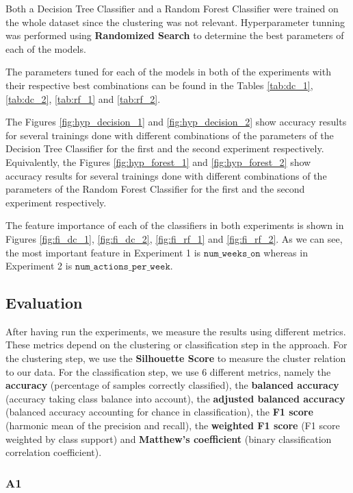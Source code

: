 \documentclass[sigplan,screen]{acmart}
\begin{document}
Both a Decision Tree Classifier and a Random Forest Classifier were trained on the whole dataset since the clustering was not relevant. Hyperparameter tunning was performed using \textbf{Randomized Search} to determine the best parameters of each of the models.

The parameters tuned for each of the models in both of the experiments with their respective best combinations can be found in the Tables \ref{tab:dc_1}, \ref{tab:dc_2}, \ref{tab:rf_1} and \ref{tab:rf_2}.

The Figures \ref{fig:hyp_decision_1} and \ref{fig:hyp_decision_2} show accuracy results for several trainings done with different combinations of the parameters of the Decision Tree Classifier for the first and the second experiment respectively. Equivalently, the Figures \ref{fig:hyp_forest_1} and \ref{fig:hyp_forest_2} show accuracy results for several trainings done with different combinations of the parameters of the Random Forest Classifier for the first and the second experiment respectively.

The feature importance of each of the classifiers in both experiments is shown in Figures \ref{fig:fi_dc_1},
\ref{fig:fi_dc_2}, \ref{fig:fi_rf_1} and \ref{fig:fi_rf_2}. As we can see, the most important feature in Experiment 1 is $\texttt{num\_weeks\_on}$ whereas in Experiment 2 is $\texttt{num\_actions\_per\_week}$.

\subsection{Evaluation}\label{subsec:eval_results}

After having run the experiments, we measure the results using different metrics. These metrics depend on the clustering or classification step in the approach. For the clustering step, we use the \textbf{Silhouette Score} to measure the cluster relation to our data. For the classification step, we use 6 different metrics\cite{scikit-learn}, namely the \textbf{accuracy} (percentage of samples correctly classified), the \textbf{balanced accuracy} (accuracy taking class balance into account), the \textbf{adjusted balanced accuracy} (balanced accuracy accounting for chance in classification), the \textbf{F1 score} (harmonic mean of the precision and recall), the \textbf{weighted F1 score} (F1 score weighted by class support) and \textbf{Matthew's coefficient} (binary classification correlation coefficient).

\subsubsection{A1}
\end{document}
